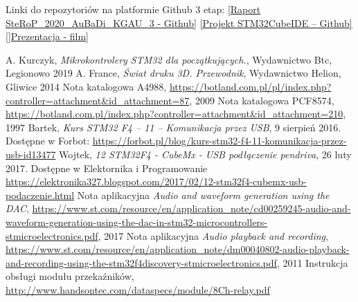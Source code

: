 \documentclass[10pt, a4paper]{article}
\begin{document}
Linki do repozytoriów na platformie Github 3 etap:
\newline
\href{https://github.com/kewingaluszka/SteRoP_2020_AuBaDi_KGAU_3}{[Raport SteRoP\_2020\_AuBaDi\_KGAU\_3 - Github]}
\newline
\href{https://github.com/kewingaluszka/AuBaDi}{[Projekt STM32CubeIDE -- Github]}
\newline
\href{www.youtube.com/watch?v=tgUb9r82Xmk}{[]Prezentacja - film]}

\newpage
%
%
\begin{thebibliography}{9}

    A. Kurczyk, \emph{Mikrokontrolery STM32 dla początkujących.}, Wydawnictwo Btc, Legionowo 2019
    A. France, \emph{Świat druku 3D. Przewodnik}, Wydawnictwo Helion, Gliwice 2014
    Nota katalogowa A4988, \url{https://botland.com.pl/pl/index.php?controller=attachment&id_attachment=87}, 2009
    Nota katalogowa PCF8574, \url{https://botland.com.pl/index.php?controller=attachment&id_attachment=210}, 1997
    Bartek, \emph{Kurs STM32 F4 – 11 – Komunikacja przez USB}, 9 sierpień 2016. Dostępne w Forbot: \url{https://forbot.pl/blog/kurs-stm32-f4-11-komunikacja-przez-usb-id13477}
    Wojtek, \emph{12 STM32F4 - CubeMx - USB podłączenie pendriva}, 26 luty 2017. Dostępne w Elektornika i Programowanie \url{https://elektronika327.blogspot.com/2017/02/12-stm32f4-cubemx-usb-podaczenie.html}
    Nota aplikacyjna \emph{Audio and waveform generation using the DAC}, \url{https://www.st.com/resource/en/application_note/cd00259245-audio-and-waveform-generation-using-the-dac-in-stm32-microcontrollers-stmicroelectronics.pdf}, 2017
    Nota aplikacyjna \emph{Audio playback and recording},
    \url{https://www.st.com/resource/en/application_note/dm00040802-audio-playback-and-recording-using-the-stm32f4discovery-stmicroelectronics.pdf}, 2011
    Instrukcja obsługi modułu przekaźników, \url{http://www.handsontec.com/dataspecs/module/8Ch-relay.pdf}
\end{thebibliography}
\end{document}
